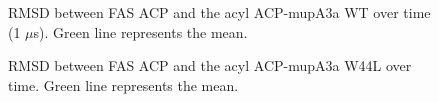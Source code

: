 \begin{singlespacing}
		\setlength\fboxsep{5pt}
		\setlength\fboxrule{1.5pt}
		\begin{figure}[htbp]
		\centering
		\caption[RMSD between FAS ACP and the acyl ACP-mupA3a WT over time (1 $ \mu $s).]{RMSD between FAS ACP and the acyl ACP-mupA3a WT over time (1 $ \mu $s). Green line represents the mean.}
		\label{fig:RMSDACPSPMWild_1000}
		\end{figure}		

		\setlength\fboxsep{5pt}
		\setlength\fboxrule{1.5pt}
		\begin{figure}[htbp]
		\centering
		\caption[RMSD between FAS ACP and the acyl ACP-mupA3a W44L over time.]{RMSD between FAS ACP and the acyl ACP-mupA3a W44L over time. Green line represents the mean.}
		\label{fig:RMSDACPSPMMutant_200}
		\end{figure}		



\end{singlespacing}
